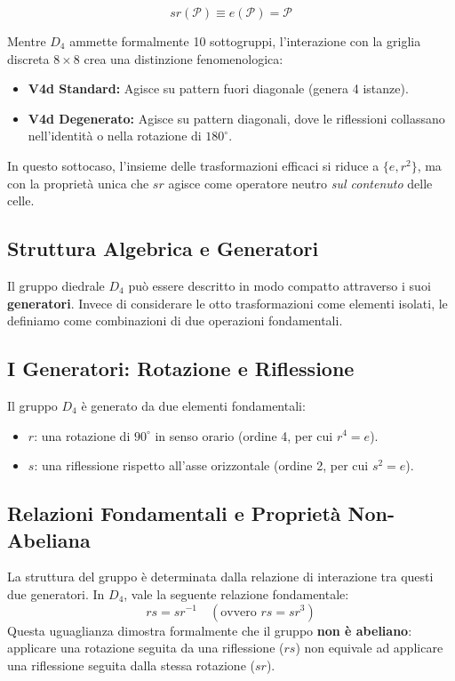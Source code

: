 \begin{equation}
    sr(\mathcal{P}) \equiv e(\mathcal{P}) = \mathcal{P}
\end{equation}

Mentre $D_4$ ammette formalmente 10 sottogruppi, l'interazione con la griglia discreta $8 \times 8$ crea una distinzione fenomenologica:
\begin{itemize}
    \item \textbf{V4d Standard:} Agisce su pattern fuori diagonale (genera 4 istanze).
    \item \textbf{V4d Degenerato:} Agisce su pattern diagonali, dove le riflessioni collassano nell'identità o nella rotazione di $180^\circ$.
\end{itemize}
In questo sottocaso, l'insieme delle trasformazioni efficaci si riduce a $\{e, r^2\}$, ma con la proprietà unica che $sr$ agisce come operatore neutro \textit{sul contenuto} delle celle.


\subsection{Struttura Algebrica e Generatori}

Il gruppo diedrale $D_4$ può essere descritto in modo compatto attraverso i suoi \textbf{generatori}. Invece di considerare le otto trasformazioni come elementi isolati, le definiamo come combinazioni di due operazioni fondamentali.

\subsection{I Generatori: Rotazione e Riflessione}
Il gruppo $D_4$ è generato da due elementi fondamentali:
\begin{itemize}
    \item $r$: una rotazione di $90^\circ$ in senso orario (ordine 4, per cui $r^4 = e$).
    \item $s$: una riflessione rispetto all'asse orizzontale (ordine 2, per cui $s^2 = e$).
\end{itemize}

\subsection{Relazioni Fondamentali e Proprietà Non-Abeliana}
La struttura del gruppo è determinata dalla relazione di interazione tra questi due generatori. In $D_4$, vale la seguente relazione fondamentale:
\begin{equation}
    rs = sr^{-1} \quad (\text{ovvero } rs = sr^3)
\end{equation}
Questa uguaglianza dimostra formalmente che il gruppo \textbf{non è abeliano}: applicare una rotazione seguita da una riflessione ($rs$) non equivale ad applicare una riflessione seguita dalla stessa rotazione ($sr$).

